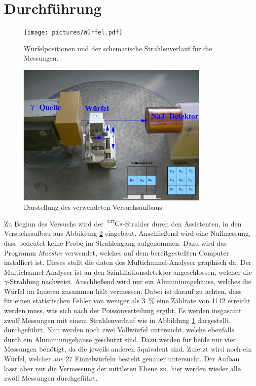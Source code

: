 \newpage
\section{Durchführung}
\label{sec:Durchführung}

\begin{figure}[htb]
  \centering
  \texttt{[image: pictures/Würfel.pdf]}
  \caption{Würfelpositionen und der schematische Strahlenverlauf für die Messungen.}
  \label{fig:wuerfel}
\end{figure}

\begin{figure}[htb]
  \centering
  \includegraphics[height=7.0cm]{content/pictures/Aufbau.png}
  \caption{Darstellung des verwendeten Versuchsaufbaus.\cite{anleitung}}
  \label{fig:Aufbau}
\end{figure}
Zu Beginn des Versuchs wird der $\ce{^137Cs}$-Strahler durch den Assistenten, in den Versuchsaufbau aus Abbildung \ref{fig:Aufbau} eingebaut. 
Anschließend wird eine Nullmessung, dass bedeutet keine Probe im Strahlengang
aufgenommen. Dazu wird das Programm \textit{Maestro} verwendet, welches auf dem bereitgestellten Computer installiert ist. Dieses stellt die daten des 
Multichannel-Analyser graphisch da. Der Multichannel-Analyser ist an den Szintillationsdetektor angeschlossen, welcher die $\gamma$-Strahlung nachweist.
Anschließend wird nur ein Aluminiumgehäuse, welches die Würfel im Inneren zusammen hält vermessen. Dabei ist darauf zu achten, dass für einen statistischen Fehler
von weniger als \SI{3}{\percent} eine Zählrate von \num{1112} erreicht werden muss, was sich nach der Poissonverteilung ergibt. Es werden insgasamt
zwölf Messungen mit einem Strahlenverlauf wie in Abbildung \ref{fig:wuerfel} dargestellt, durchgeführt.
Nun werden noch zwei Vollwürfel untersucht, welche ebenfalls durch ein Aluminiumgehäuse geschützt sind. Dazu werden für beide nur vier Messungen benötigt,
da die jeweils anderen äquivalent sind.
Zuletzt wird noch ein Würfel, welcher aus \num{27} Einzelwürfeln besteht genauer untersucht. Der Aufbau lässt aber nur die Vermessung der mittleren Ebene zu, hier werden 
wieder alle zwölf Messungen durchgeführt.
\FloatBarrier